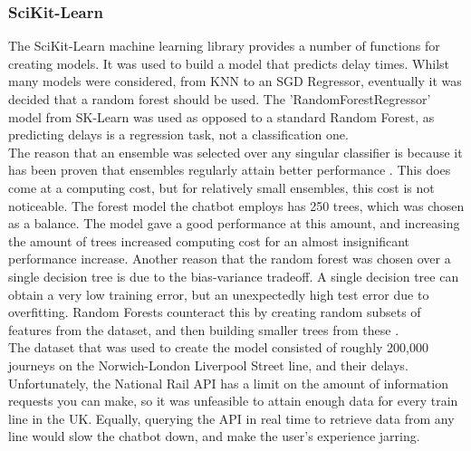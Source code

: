 \documentclass[12pt,a4paper]{article}
\begin{document}
    \subsubsection*{SciKit-Learn}
    The SciKit-Learn machine learning library provides a number of functions for creating models. It was used to build a model that predicts delay times. Whilst many models were considered, from KNN to an SGD Regressor, eventually it was decided that a random forest should be used. The 'RandomForestRegressor' model from SK-Learn was used as opposed to a standard Random Forest, as predicting delays is a regression task, not a classification one. \\
    
    The reason that an ensemble was selected over any singular classifier is because it has been proven that ensembles regularly attain better performance \citep{Dietterich2000}. This does come at a computing cost, but for relatively small ensembles, this cost is not noticeable. The forest model the chatbot employs has 250 trees, which was chosen as a balance. The model gave a good performance at this amount, and increasing the amount of trees increased computing cost for an almost insignificant performance increase. Another reason that the random forest was chosen over a single decision tree is due to the bias-variance tradeoff. A single decision tree can obtain a very low training error, but an unexpectedly high test error due to overfitting. Random Forests counteract this by creating random subsets of features from the dataset, and then building smaller trees from these \citep{Breiman2001}. \\
    
    The dataset that was used to create the model consisted of roughly 200,000 journeys on the Norwich-London Liverpool Street line, and their delays. Unfortunately, the National Rail API has a limit on the amount of information requests you can make, so it was unfeasible to attain enough data for every train line in the UK. Equally, querying the API in real time to retrieve data from any line would slow the chatbot down, and make the user's experience jarring. \\
    
\end{document}
